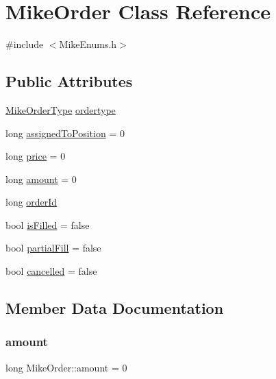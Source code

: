 \hypertarget{class_mike_order}{}\section{Mike\+Order Class Reference}
\label{class_mike_order}


{\ttfamily \#include $<$Mike\+Enums.\+h$>$}

\subsection*{Public Attributes}
\begin{DoxyCompactItemize}
\item 
\hyperlink{_mike_enums_8h_ab4a7006a6e3be52a2e59ff26198d9ee1}{Mike\+Order\+Type} \hyperlink{class_mike_order_a688ac5a5834637ca1e7b2758c0a55478}{ordertype}
\item 
long \hyperlink{class_mike_order_a6df542f4fb3b3c79b508349e397b5e83}{assigned\+To\+Position} = 0
\item 
long \hyperlink{class_mike_order_a20a48ccf6f6980182d5a2eee62c439aa}{price} = 0
\item 
long \hyperlink{class_mike_order_a7ba5f0c33df2d790761605408b86254f}{amount} = 0
\item 
long \hyperlink{class_mike_order_a5dcf22562a21d3f98d1ce65981bb3992}{order\+Id}
\item 
bool \hyperlink{class_mike_order_af48f9d511cab7de91c33eeeb108c334a}{is\+Filled} = false
\item 
bool \hyperlink{class_mike_order_a998f64ee97190c0a9c8ca51d13210718}{partial\+Fill} = false
\item 
bool \hyperlink{class_mike_order_acb3c85bbbb48a4f147f7133461ad920c}{cancelled} = false
\end{DoxyCompactItemize}


\subsection{Member Data Documentation}
\mbox{\label{class_mike_order_a7ba5f0c33df2d790761605408b86254f}} 
\subsubsection{\texorpdfstring{amount}{amount}}
{\footnotesize\ttfamily long Mike\+Order\+::amount = 0}

